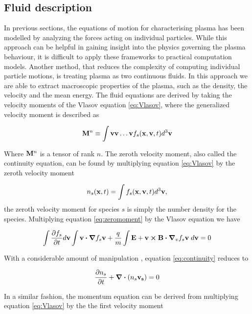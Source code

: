 \subsection{Fluid description}
In previous sections, the equations of motion for characterising plasma has been modelled by analyzing the forces acting on individual particles. While this approach can be helpful in gaining insight into the physics governing the plasma behaviour, it is difficult to apply these frameworks to practical computation models. 
\vskip 1mm
Another method, that reduces the complexity of computing individual particle motions, is treating plasma as two continuous fluids. In this approach we are able to extract macroscopic properties of the plasma, such as the density, the velocity and the mean energy. The fluid equations are derived by taking the velocity moments of the Vlasov equation \eqref{eq:Vlasov}, where the generalized velocity moment is described as

\begin{equation}\label{eq:moment}
    \vb{M}^n \equiv \int \vb{v}\vb{v} \ldots \vb{v} f_s(\vb{x}, \vb{v}, t) d^3 \vb{v}
\end{equation}

Where $\vb{M}^n$ is a tensor of rank $n$. The zeroth velocity moment, also called the continuity equation, can be found by multiplying equation \eqref{eq:Vlasov} by the zeroth velocity moment 

\begin{equation}\label{eq:zeromoment}
    n_s(\vb{x}, t) = \int f_s(\vb{x}, \vb{v}, t) d^3 \vb{v},
\end{equation}
the zeroth velocity moment for species $s$ is simply the number density for the species. Multiplying equation \eqref{eq:zeromoment} by the Vlasov equation we have

\begin{equation}\label{eq:continuity}
    \int \pdv{f_s}{t} d \vb{v} \int \vb{v} \vdot \grad{f_s} \vb{v} + \frac{q}{m} \int \vb{E} + \vb{v} \cp \vb{B} \vdot \grad_v{f_s}{\vb{v}}  \;d \vb{v} = 0
\end{equation}

With a considerable amount of manipulation \parencite[ch 7]{Chen2018}, equation \eqref{eq:continuity} reduces to

\begin{equation}\label{eq:contReduced}
    \pdv{n_s}{t} + \div{(n_s \vb{v_s})} = 0 
\end{equation}


In a similar fashion, the momentum equation can be derived from multiplying equation \eqref{eq:Vlasov} by the the first velocity moment

